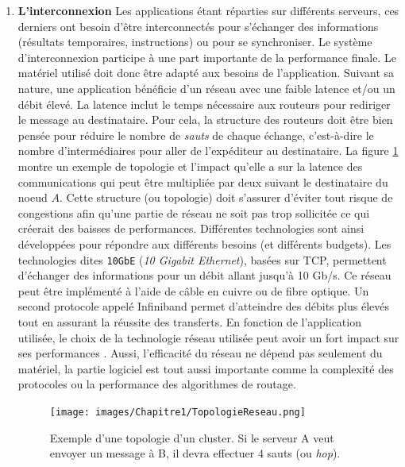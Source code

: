 \begin{enumerate}
            \item \textbf{L'interconnexion}\label{sec:edl_interco} Les applications étant réparties sur différents serveurs, ces derniers ont besoin d'être interconnectés pour s'échanger des informations (résultats temporaires, instructions) ou pour se synchroniser. Le système d'interconnexion participe à une part importante de la performance finale. Le matériel utilisé doit donc être adapté aux besoins de l'application. Suivant sa nature, une application bénéficie d'un réseau avec une faible latence et/ou un débit élevé.
            La latence inclut le temps nécessaire aux routeurs pour rediriger le message au destinataire. Pour cela, la structure des routeurs doit être bien pensée pour réduire le nombre de \textit{sauts} de chaque échange, c'est-à-dire le nombre d'intermédiaires pour aller de l'expéditeur au destinataire. La figure \ref{pic_topologie} montre un exemple de topologie et l'impact qu'elle a sur la latence des communications qui peut être multipliée par deux suivant le destinataire du noeud $A$. Cette structure (ou topologie) doit s'assurer d'éviter tout risque de congestions afin qu'une partie de réseau ne soit pas trop sollicitée ce qui créerait des baisses de performances.    
            Différentes technologies sont ainsi développées pour répondre aux différents besoins (et différents budgets). Les technologies dites \verb|10GbE| (\textit{10 Gigabit Ethernet}), basées sur TCP, permettent d'échanger des informations pour un débit allant jusqu'à 10 Gb/s. Ce réseau peut être implémenté à l'aide de câble en cuivre ou de fibre optique. Un second protocole appelé Infiniband permet d'atteindre des débits plus élevés tout en assurant la réussite des transferts. En fonction de l'application utilisée, le choix de la technologie réseau utilisée peut avoir un fort impact sur ses performances \cite{Council2009}.
                Aussi, l'efficacité du réseau ne dépend pas seulement du matériel, la partie logiciel est tout aussi importante comme la complexité des protocoles ou la performance des algorithmes de routage.
                
                    \begin{figure}
                    \center
                    \texttt{[image: images/Chapitre1/TopologieReseau.png]}
                    \caption{\label{pic_topologie} Exemple d'une topologie d'un cluster. Si le serveur A veut envoyer un message à B, il devra effectuer 4 sauts (ou \textit{hop}).}
                    \end{figure}
          

\end{enumerate}
